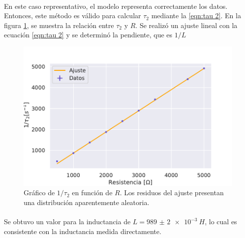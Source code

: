 \paragraph{}
En este caso representativo, el modelo representa correctamente los datos. Entonces, este método es válido para calcular $\tau_2$ mediante la \eqref{eqn:tau 2}. En la figura \ref{fig:RL tau R}, se muestra la relación entre $\tau_2$ y $R$. Se realizó un ajuste lineal con la ecuación \eqref{eqn:tau 2} y se determinó la pendiente, que es $1/L$
\begin{figure}[H]
    \centering
    \includegraphics[scale=0.7]{Figuras/RL/tau RL.pdf}
    \caption{Gráfico de $1/\tau_2$ en función de $R$. Los residuos del ajuste presentan una distribución aparentemente aleatoria.}
    \label{fig:RL tau R}
\end{figure}
\paragraph{}
Se obtuvo un valor para la inductancia de $L=\SI{989(2)e-3}{H}$, lo cual es consistente con la inductancia medida directamente.

